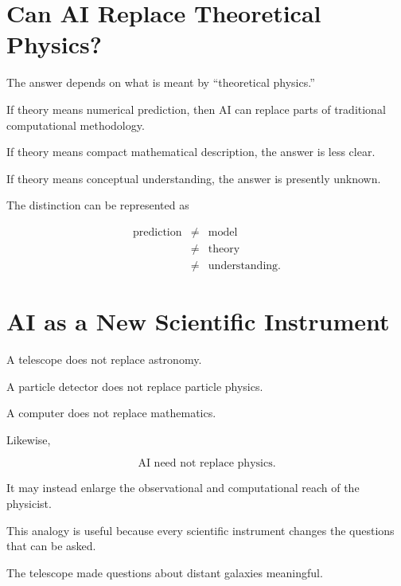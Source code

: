 \documentclass[11pt,a4paper,oneside]{book}
\begin{document}
\chapter{Can AI Replace Theoretical Physics?}

The answer depends on what is meant by ``theoretical physics.''

If theory means numerical prediction, then AI can replace parts of traditional
computational methodology.

If theory means compact mathematical description, the answer is less clear.

If theory means conceptual understanding, the answer is presently unknown.

The distinction can be represented as

\begin{equation}
\boxed{
\begin{array}{rcl}
\text{prediction}
&\neq&
\text{model}\\
&\neq&
\text{theory}\\
&\neq&
\text{understanding}.
\end{array}}
\end{equation}

\chapter{AI as a New Scientific Instrument}

A telescope does not replace astronomy.

A particle detector does not replace particle physics.

A computer does not replace mathematics.

Likewise,

\begin{equation}
\boxed{
\text{AI need not replace physics}.
}
\end{equation}

It may instead enlarge the observational and computational reach of the
physicist.

This analogy is useful because every scientific instrument changes the
questions that can be asked.

The telescope made questions about distant galaxies meaningful.
\end{document}
